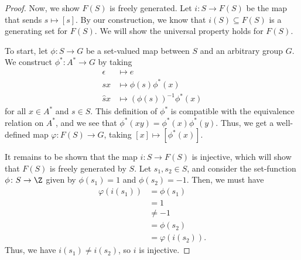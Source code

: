 \begin{proof}
  Now, we show $F(S)$ is freely generated. Let $i\colon S\rightarrow F(S)$ be the map that sends $s\mapsto \left[s\right]$. By our construction, we know that $i(S)\subseteq F(S)$ is a generating set for $F(S)$. We will show the universal property holds for $F(S)$.\newline

  To start, let $\phi\colon S\rightarrow G$ be a set-valued map between $S$ and an arbitrary group $G$. We construct $\phi^{\ast}\colon A^{\ast}\rightarrow G$ by taking
  \begin{align*}
    \epsilon &\mapsto e\\
    sx &\mapsto \phi(s)\phi^{\ast}\left(x\right)\\
    \hat{s}x &\mapsto \left(\phi(s)\right)^{-1}\phi^{\ast}\left(x\right)
  \end{align*}
  for all $x\in A^{\ast}$ and $s\in S$. This definition of $\phi^{\ast}$ is compatible with the equivalence relation on $A^{\ast}$, and we see that $\phi^{\ast}\left(xy\right) = \phi^{\ast}\left(x\right)\phi^{\ast}\left(y\right)$. Thus, we get a well-defined map $\varphi\colon F(S)\rightarrow G$, taking $\left[x\right]\mapsto \left[\phi^{\ast}\left(x\right)\right]$.\newline

  It remains to be shown that the map $i\colon S\rightarrow F(S)$ is injective, which will show that $F(S)$ is freely generated by $S$. Let $s_1,s_2\in S$, and consider the set-function $\phi\colon S\rightarrow \Z$ given by $\phi\left(s_1\right) = 1$ and $\phi\left(s_2\right) = -1$. Then, we must have
  \begin{align*}
    \varphi\left(i\left(s_1\right)\right) &= \phi\left(s_1\right)\\
                                          &= 1\\
                                          &\neq -1\\
                                          &= \phi\left(s_2\right)\\
                                          &= \varphi\left(i\left(s_2\right)\right).
  \end{align*}
  Thus, we have $i\left(s_1\right)\neq i\left(s_2\right)$, so $i$ is injective.
\end{proof}

